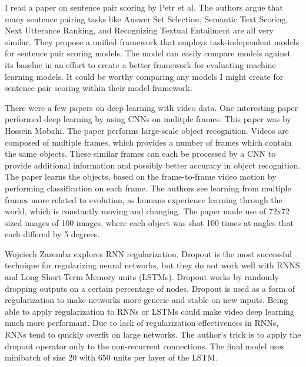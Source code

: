 I read a paper on sentence pair scoring by Petr et al.  The authors argue that many sentence pairing tasks like Answer Set Selection, Semantic Text Scoring, Next Utterance Ranking, and Recognizing Textual Entailment are all very similar.  They propose a unified framework that employs task-independent models for sentence pair scoring models.  The model can easily compare models against its baselne in an effort to create a better framework for evaluating machine learning models.  It could be worthy comparing any models I might create for sentence pair scoring within their model framework.

There were a few papers on deep learning with video data.  One interesting paper performed deep learning by using CNNs on mulitple frames.  This paper was by Hossein Mobahi.  The paper performs large-scale object recognition.  Videos are composed of multiple frames, which provides a number of frames which contain the same objects.  These similar frames can each be processed by a CNN to provide additional information and possibly better accuracy in object recognition.  The paper learns the objects, based on the frame-to-frame video motion by performing classification on each frame.  The authors see learning from multiple frames more related to evolution, as humans experience learning through the world, which is constantly moving and changing.  The paper made use of 72x72 sized images of 100 images, where each object was shot 100 times at angles that each differed by 5 degrees.

Wojciech Zaremba explores RNN regularization.  Dropout is the most successful technique for regularizing neural networks, but they do not work well with RNNS and Long Short-Term Memory units (LSTMs).  Dropout works by randomly dropping outputs on a certain percentage of nodes.  Dropout is used as a form of regularization to make networks more generic and stable on new inputs.  Being able to apply regularization to RNNs or LSTMs could make video deep learning much more performant.  Due to lack of regularization effectiveness in RNNs, RNNs tend to quickly overfit on large networks.  The author's trick is to apply the dropout operator only to the non-recurrent connections.  The final model uses minibatch of size 20 with 650 units per layer of the LSTM.





